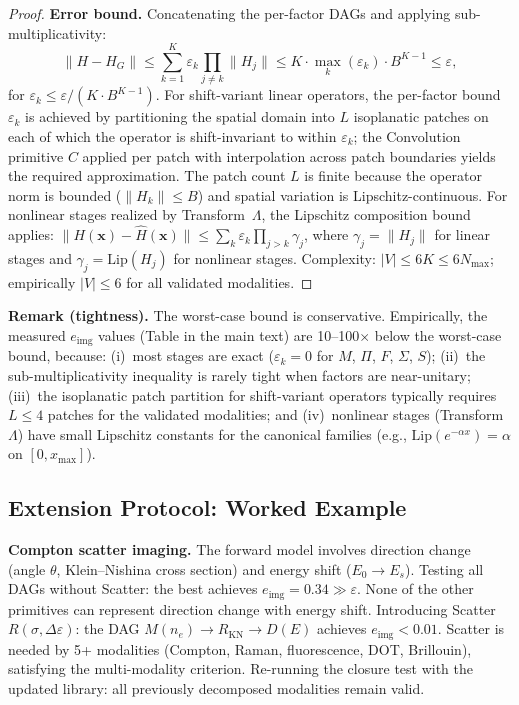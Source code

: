 \documentclass[11pt]{article}
\theoremstyle{definition}
\begin{document}
\begin{proof}
\medskip
\noindent\textbf{Error bound.}
Concatenating the per-factor DAGs and applying sub-multiplicativity:
\begin{equation}
  \|H - H_G\| \leq \sum_{k=1}^{K} \varepsilon_k \prod_{j \neq k} \|H_j\|
  \leq K \cdot \max_k(\varepsilon_k) \cdot B^{K-1} \leq \varepsilon,
\end{equation}
for $\varepsilon_k \leq \varepsilon / (K \cdot B^{K-1})$. For shift-variant linear operators, the per-factor bound $\varepsilon_k$ is achieved by partitioning the spatial domain into $L$ isoplanatic patches on each of which the operator is shift-invariant to within $\varepsilon_k$; the Convolution primitive $C$ applied per patch with interpolation across patch boundaries yields the required approximation. The patch count $L$ is finite because the operator norm is bounded ($\|H_k\| \leq B$) and spatial variation is Lipschitz-continuous. For nonlinear stages realized by Transform~$\Lambda$, the Lipschitz composition bound applies: $\|H(\mathbf{x}) - \hat{H}(\mathbf{x})\| \leq \sum_k \varepsilon_k \prod_{j>k} \gamma_j$, where $\gamma_j = \|H_j\|$ for linear stages and $\gamma_j = \mathrm{Lip}(H_j)$ for nonlinear stages. Complexity: $|V| \leq 6K \leq 6 N_{\max}$; empirically $|V| \leq 6$ for all validated modalities.
\end{proof}

\noindent\textbf{Remark (tightness).} The worst-case bound is conservative. Empirically, the measured $e_{\mathrm{img}}$ values (Table in the main text) are 10--100$\times$ below the worst-case bound, because: (i)~most stages are exact ($\varepsilon_k = 0$ for $M$, $\Pi$, $F$, $\Sigma$, $S$); (ii)~the sub-multiplicativity inequality is rarely tight when factors are near-unitary; (iii)~the isoplanatic patch partition for shift-variant operators typically requires $L \leq 4$ patches for the validated modalities; and (iv)~nonlinear stages (Transform~$\Lambda$) have small Lipschitz constants for the canonical families (e.g., $\mathrm{Lip}(e^{-\alpha x}) = \alpha$ on $[0, x_{\max}]$).

\subsection{Extension Protocol: Worked Example}

\noindent\textbf{Compton scatter imaging.} The forward model involves direction change (angle $\theta$, Klein--Nishina cross section) and energy shift ($E_0 \to E_s$). Testing all DAGs without Scatter: the best achieves $e_{\mathrm{img}} = 0.34 \gg \varepsilon$. None of the other primitives can represent direction change with energy shift. Introducing Scatter $R(\sigma, \Delta\varepsilon)$: the DAG $M(n_e) \to R_{\mathrm{KN}} \to D(E)$ achieves $e_{\mathrm{img}} < 0.01$. Scatter is needed by 5+ modalities (Compton, Raman, fluorescence, DOT, Brillouin), satisfying the multi-modality criterion. Re-running the closure test with the updated library: all previously decomposed modalities remain valid.
\end{document}
